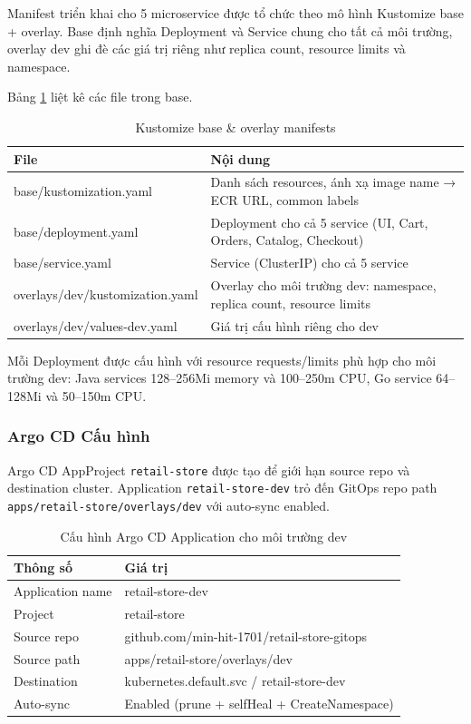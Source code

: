 \documentclass[13pt,a4paper,twoside]{extarticle}
\begin{document}
Manifest triển khai cho 5 microservice được tổ chức theo mô hình Kustomize base + overlay. Base định nghĩa Deployment và Service chung cho tất cả môi trường, overlay dev ghi đè các giá trị riêng như replica count, resource limits và namespace.

Bảng \ref{tab:kustomize-base} liệt kê các file trong base.

\begin{table}[H]
\centering
\begin{tabular}{@{}p{6cm} p{8cm}@{}}
\toprule
\textbf{File} & \textbf{Nội dung} \\
\midrule
base/kustomization.yaml & Danh sách resources, ánh xạ image name → ECR URL, common labels \\
base/deployment.yaml & Deployment cho cả 5 service (UI, Cart, Orders, Catalog, Checkout) \\
base/service.yaml & Service (ClusterIP) cho cả 5 service \\
overlays/dev/kustomization.yaml & Overlay cho môi trường dev: namespace, replica count, resource limits \\
overlays/dev/values-dev.yaml & Giá trị cấu hình riêng cho dev \\
\bottomrule
\end{tabular}
\caption{Kustomize base \& overlay manifests}
\label{tab:kustomize-base}
\end{table}

Mỗi Deployment được cấu hình với resource requests/limits phù hợp cho môi trường dev: Java services 128--256Mi memory và 100--250m CPU, Go service 64--128Mi và 50--150m CPU.

\subsubsection{Argo CD Cấu hình}

Argo CD AppProject \texttt{retail-store} được tạo để giới hạn source repo và destination cluster. Application \texttt{retail-store-dev} trỏ đến GitOps repo path \texttt{apps/retail-store/overlays/dev} với auto-sync enabled.

\begin{table}[H]
\centering
\begin{tabular}{@{}p{5.5cm} p{8.5cm}@{}}
\toprule
\textbf{Thông số} & \textbf{Giá trị} \\
\midrule
Application name & retail-store-dev \\
Project & retail-store \\
Source repo & github.com/min-hit-1701/retail-store-gitops \\
Source path & apps/retail-store/overlays/dev \\
Destination & kubernetes.default.svc / retail-store-dev \\
Auto-sync & Enabled (prune + selfHeal + CreateNamespace) \\
\bottomrule
\end{tabular}
\caption{Cấu hình Argo CD Application cho môi trường dev}
\label{tab:argocd-app}
\end{table}
\end{document}
